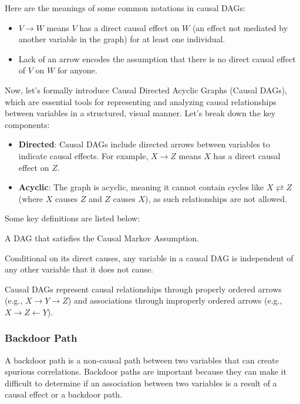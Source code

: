 Here are the meanings of some common notations in causal DAGs:

\begin{itemize}
    \item $V \rightarrow W$ means $V$ has a direct causal effect on $W$ (an effect not mediated by another variable in the graph) for at least one individual.
    \item Lack of an arrow encodes the assumption that there is no direct causal effect of $V$ on $W$ for anyone.
\end{itemize}

Now, let's formally introduce Causal Directed Acyclic Graphs (Causal DAGs), which are essential tools for representing and analyzing causal relationships between variables in a structured, visual manner. Let's break down the key components:

\begin{itemize}
    \item \textbf{Directed}: Causal DAGs include directed arrows between variables to indicate causal effects. For example, $X \rightarrow Z$ means $X$ has a direct causal effect on $Z$.
    \item \textbf{Acyclic}: The graph is acyclic, meaning it cannot contain cycles like $X \rightleftarrows Z$ (where $X$ causes $Z$ and $Z$ causes $X$), as such relationships are not allowed.
\end{itemize}


Some key definitions are listed below:

\begin{definition} 
A DAG that satisfies the Causal Markov Assumption.
\end{definition}

\begin{definition} 
Conditional on its direct causes, any variable in a causal DAG is independent of any other variable that it does not cause.
\end{definition}

Causal DAGs represent causal relationships through properly ordered arrows (e.g., $X \rightarrow Y \rightarrow Z$) and associations through improperly ordered arrows (e.g., $X \rightarrow Z \leftarrow Y$).

\subsubsection{Backdoor Path}

A backdoor path is a non-causal path between two variables that can create spurious correlations. Backdoor paths are important because they can make it difficult to determine if an association between two variables is a result of a causal effect or a backdoor path. 

